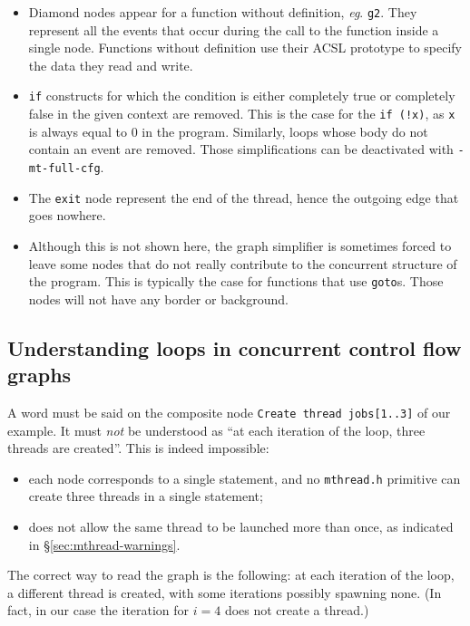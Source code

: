 \documentclass{frama-c-book}
\def\eg.{\emph{eg}.}
\def\mysec#1{\S{\ref{sec:#1}}}
\begin{document}
\begin{itemize}
\item Diamond nodes appear for a function without
  definition, \eg. \verb+g2+.  They represent all the events that occur
  during the call to the function inside a single node. Functions
  without definition use their  ACSL prototype to specify the data
  they read and write.

\item \verb+if+ constructs for which the condition is either
  completely true or completely false in the given context are
  removed. This is the case for the \verb+if (!x)+, as \verb+x+ is
  always equal to 0 in the program. Similarly, loops whose body do not
  contain an event are removed. Those simplifications can be
  deactivated with \verb+-mt-full-cfg+.

\item The \verb+exit+ node represent the end of the thread, hence
  the outgoing edge that goes nowhere.

\item Although this is not shown here, the \mthread graph simplifier
  is sometimes forced to leave some nodes that do not really
  contribute to the concurrent structure of the program. This is
  typically the case for functions that use \verb+goto+s. Those nodes
  will not have any border or background.

\end{itemize}


\subsection{Understanding loops in concurrent control flow graphs}

A word must be said on the composite node \verb|Create thread jobs[1..3]|
of our example. It must \emph{not} be understood as ``at each iteration
of the loop, three threads are created''. This is indeed impossible:
\begin{itemize}
\item each node corresponds to a single statement,
  and no \verb+mthread.h+ primitive can create three threads in a single
  statement;
\item \mthread does not allow the same thread to be launched  more than once,
  as indicated in \mysec{mthread-warnings}.
\end{itemize}

The correct way to read the graph is the following: at each iteration
of the loop, a different thread is created, with some iterations
possibly spawning none. (In fact, in our case the
iteration for $i=4$ does not create a thread.)
\end{document}
